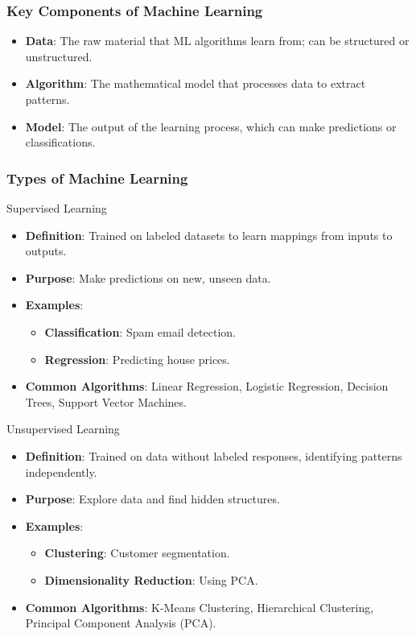 \documentclass[aspectratio=169]{beamer}
\begin{document}
\begin{frame}[fragile]
    \frametitle{Key Components of Machine Learning}
    
    \begin{itemize}
        \item \textbf{Data}: The raw material that ML algorithms learn from; can be structured or unstructured.
        \item \textbf{Algorithm}: The mathematical model that processes data to extract patterns.
        \item \textbf{Model}: The output of the learning process, which can make predictions or classifications.
    \end{itemize}

\end{frame}

\begin{frame}[fragile]
    \frametitle{Types of Machine Learning}
    
    \begin{block}{Supervised Learning}
        \begin{itemize}
            \item \textbf{Definition}: Trained on labeled datasets to learn mappings from inputs to outputs.
            \item \textbf{Purpose}: Make predictions on new, unseen data.
            \item \textbf{Examples}:
            \begin{itemize}
                \item \textbf{Classification}: Spam email detection.
                \item \textbf{Regression}: Predicting house prices.
            \end{itemize}
            \item \textbf{Common Algorithms}: Linear Regression, Logistic Regression, Decision Trees, Support Vector Machines.
        \end{itemize}
    \end{block}

    \begin{block}{Unsupervised Learning}
        \begin{itemize}
            \item \textbf{Definition}: Trained on data without labeled responses, identifying patterns independently.
            \item \textbf{Purpose}: Explore data and find hidden structures.
            \item \textbf{Examples}:
            \begin{itemize}
                \item \textbf{Clustering}: Customer segmentation.
                \item \textbf{Dimensionality Reduction}: Using PCA.
            \end{itemize}
            \item \textbf{Common Algorithms}: K-Means Clustering, Hierarchical Clustering, Principal Component Analysis (PCA).
        \end{itemize}
    \end{block}


\end{frame}
\end{document}
